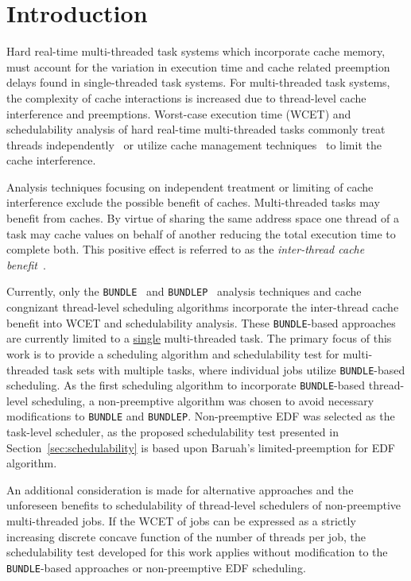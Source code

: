 \documentclass[a4paper,UKenglish,cleveref,autoref,english]{lipics-v2019}
\newcommand{\bundlep}{\texttt{BUNDLEP}}
\newcommand{\bundle}{\texttt{BUNDLE}}
\begin{document}
\section{Introduction}

Hard real-time multi-threaded task systems which incorporate cache
memory, must account for the variation in execution time and cache
related preemption delays found in single-threaded task systems. For
multi-threaded task systems, the complexity of cache interactions is
increased due to thread-level cache interference and preemptions.
Worst-case execution time (WCET) and schedulability analysis of hard
real-time multi-threaded tasks commonly treat threads
independently~\cite{Pellizzoni:2011} or utilize cache management
techniques~\cite{Ward:2013} to limit the cache interference. 

Analysis techniques focusing on independent treatment or
limiting of cache interference exclude the possible benefit of
caches. Multi-threaded tasks may benefit from caches. By virtue of
sharing the same address space one thread of a task may cache values
on behalf of another reducing the total execution time to complete
both. This positive effect is referred to as the
\emph{inter-thread cache benefit}~\cite{Tessler:2016}. 

Currently, only the \bundle{}~\cite{Tessler:2016} and
\bundlep{}~\cite{Tessler:2018} analysis techniques and cache
congnizant thread-level scheduling algorithms incorporate the
inter-thread cache benefit into WCET and schedulability
analysis. These \texttt{BUNDLE}-based approaches are currently limited
to a \underline{single} multi-threaded task. The primary focus of this
work is to provide a scheduling algorithm and schedulability test for
multi-threaded task sets with multiple tasks, where individual jobs
utilize \texttt{BUNDLE}-based scheduling. As the first scheduling
algorithm to incorporate \texttt{BUNDLE}-based thread-level
scheduling, a non-preemptive algorithm was chosen to avoid necessary
modifications to \bundle{} and \bundlep{}. Non-preemptive EDF was
selected as the task-level scheduler, as the proposed schedulability
test presented in Section~\ref{sec:schedulability} is based upon
Baruah's limited-preemption for EDF~\cite{Baruah:2005} algorithm. 

An additional consideration is made for alternative approaches and
the unforeseen benefits to schedulability of thread-level schedulers
of non-preemptive multi-threaded jobs. If the WCET of jobs can be
expressed as a strictly increasing discrete concave function of the
number of threads per job, the schedulability test developed for this
work applies without modification to the \texttt{BUNDLE}-based
approaches or non-preemptive EDF scheduling. 
\end{document}
